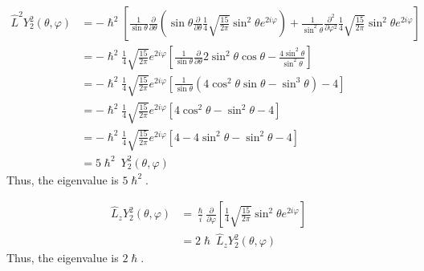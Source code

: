 \documentclass[10pt]{article}
\begin{document}
\begin{enumerate}
    \begin{align*}
      \hat{L}^2 Y_{2}^{2}\left( \theta, \varphi \right) &= - \hslash^2 \left[ \frac{1}{\sin \theta} \frac{\partial }{\partial \theta} \left( \sin \theta \frac{\partial }{\partial \theta} \frac{1}{4} \sqrt{\frac{15}{2\pi}} \sin ^2 \theta e ^ {2i \varphi} \right) + \frac{1}{\sin ^2 \theta} \frac{\partial ^2}{\partial \varphi^2} \frac{1}{4}\sqrt{\frac{15}{2\pi}} \sin ^2 \theta e ^ {2i \varphi}\right] \\
      &= - \hslash^2 \frac{1}{4} \sqrt{\frac{15}{2\pi}} e ^ {2i\varphi}\left[ \frac{1}{\sin \theta} \frac{\partial }{\partial \theta} 2 \sin^2\theta\cos\theta - \frac{4 \sin^2\theta}{\sin ^2 \theta} \right] \\
      &= - \hslash^2 \frac{1}{4} \sqrt{\frac{15}{2\pi}} e ^ {2i\varphi}\left[ \frac{1}{\sin \theta} \left( 4 \cos^2\theta \sin\theta - \sin^3\theta \right) - 4 \right] \\
      &= - \hslash^2 \frac{1}{4} \sqrt{\frac{15}{2\pi}} e ^ {2i\varphi}\left[ 4 \cos^2 \theta - \sin ^2 \theta - 4 \right] \\
      &= - \hslash^2 \frac{1}{4} \sqrt{\frac{15}{2\pi}} e ^ {2i\varphi}\left[ 4 - 4 \sin^2 \theta - \sin ^2 \theta - 4 \right] \\
      &= 5 \hslash^2 ~ Y_2^2 \left( \theta, \varphi \right)
    \end{align*}
    Thus, the eigenvalue is $ 5 \hslash ^2 $.

    \begin{align*}
      \hat{L}_{z} Y_{2}^{2}\left( \theta, \varphi \right) &= \frac{\hslash}{i} \frac{\partial }{\partial \varphi} \left[ \frac{1}{4} \sqrt{\frac{15}{2\pi}} \sin^2 \theta e ^ {2i \varphi}\right] \\
      &= 2\hslash ~ \hat{L}_{z} Y_{2}^{2}\left( \theta, \varphi \right) 
    \end{align*}
    Thus, the eigenvalue is $ 2 \hslash $.
\end{enumerate}
\end{document}
